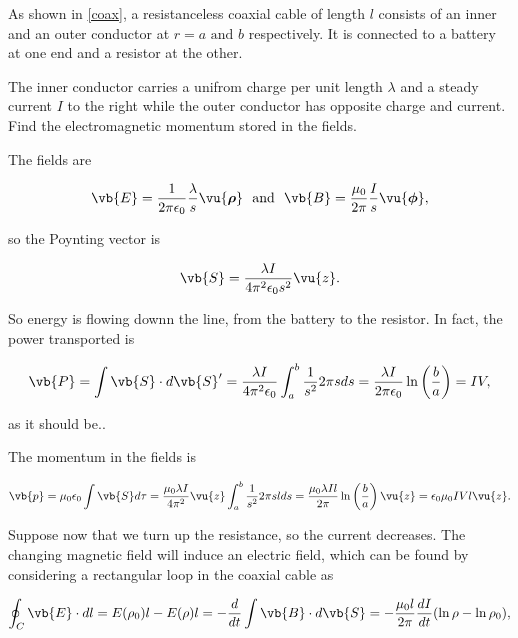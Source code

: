 \documentclass[english,a4paper,12pt]{report}
\begin{document}
{As shown in \cref{coax}, a resistanceless coaxial cable of length \(l\) consists of an inner and an outer conductor at \(r = a \text { and } b\) respectively. It is connected to a battery at one end and a resistor at the other. 

The inner conductor carries a unifrom charge per unit length \(\lambda \) and a steady current \(I\) to the right while the outer conductor has opposite charge and current. Find the electromagnetic momentum stored in the fields.}
{The fields are 

\begin{equation}
    \vb{E} = \frac{1}{2\pi \epsilon_0 } \frac{\lambda }{s} \vu{\boldsymbol{\rho }} ~\text { and }~ \vb{B} = \frac{\mu_0 }{2\pi } \frac{I}{s} \vu{\boldsymbol{\phi }},      
\end{equation}

so the Poynting vector is 

\begin{equation}
    \vb{S} = \frac{\lambda I}{4\pi ^2\epsilon_0 s ^2}\vu{z}. 
\end{equation}

So energy is flowing downn the line, from the battery to the resistor. In fact, the power transported is 

\begin{equation}
    \vb{P} = \int \vb{S} \cdot d\vb{S} ' = \frac{\lambda I}{4\pi ^2\epsilon_0 } \int_{a}^{b} \frac{1}{s ^2} 2\pi s ds= \frac{\lambda I}{2\pi \epsilon_0 } \ln \left( \frac{b}{a}  \right) = IV, 
\end{equation}

as it should be..

The momentum in the fields is 

\begin{equation}
    \vb{p} = \mu_0 \epsilon_0 \int \vb{S} d\tau = \frac{\mu_0 \lambda I}{4\pi ^2}\vu{z} \int_{a}^{b} \frac{1}{s ^2}2\pi s lds = \frac{\mu_0 \lambda Il}{2\pi } \ln \left( \frac{b}{a}  \right) \vu{z} = \epsilon_0 \mu_0 IVl \vu{z} .    
\end{equation}

Suppose now that we turn up the resistance, so the current decreases. The changing magnetic field will induce an electric field, which can be found by considering a rectangular loop in the coaxial cable as

\begin{equation}
    \oint_{C} \vb{E} \cdot dl = E(\rho _{0} )l - E(\rho )l = -\frac{d}{dt} \int \vb{B} \cdot d\vb{S} = - \frac{\mu_0 l}{2\pi } \frac{dI}{dt} (\ln \rho  - \ln \rho _0 ), 
\end{equation}

}
\end{document}
